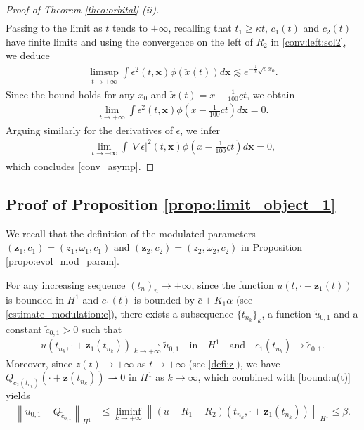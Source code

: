 \documentclass[reqno,10pt]{amsart}
\numberwithin{equation}{section}
\newcommand{\bx}{\mathbf{x}}
\newcommand{\bz}{\mathbf{z}}
\begin{document}
\begin{proof}[Proof of Theorem \ref{theo:orbital} (ii)]
\begin{align*}
\end{align*}
Passing to the limit as $t$ tends to $+\infty$, recalling that $t_1 \geq \kappa t$, $c_1(t)$ and $c_2(t)$ have finite limits and using the convergence on the left of $R_2$ in \eqref{conv:left:sol2}, we deduce
\begin{align*}
	\limsup_{t\rightarrow + \infty} \int \epsilon^2(t,\bx) \phi(\check{x}(t)) d\bx \lesssim e^{-\frac{1}{8}\sqrt{\underline{c}}x_0}.
\end{align*}
Since the bound holds for any $x_0$ and $\check{x}(t)=x-\frac{1}{100} \underline{c} t$, we obtain
\begin{align*}
	\lim_{t\rightarrow +\infty} \int \epsilon^2(t, \bx) \phi(x-\frac1{100} \underline{c} t) d\bx =0.
\end{align*}
Arguing similarly for the derivatives of $\epsilon$, we infer
\begin{align*}
	\lim_{t\rightarrow +\infty} \int \vert \nabla \epsilon \vert^2 (t, \bx) \phi(x-\frac1{100} \underline{c} t) d\bx =0,
\end{align*}
which concludes \eqref{conv_asymp}.

\end{proof}
	
\subsection{Proof of Proposition \ref{propo:limit_object_1}}	
		
		
		We recall that the definition of the modulated parameters $(\bz_1,c_1)=(z_1,\omega_1,c_1)$ and $(\bz_2,c_2)=(z_2,\omega_2,c_2)$ in Proposition \ref{propo:evol_mod_param}.
		
		For any increasing sequence $(t_n)_n\rightarrow +\infty$, since the function $u(t, \cdot + \bz_1(t))$ is bounded in $H^1$  and $c_1(t)$ is bounded by $\bar{c}+K_1\alpha$ (see \eqref{estimate_modulation:c}), there exists a subsequence $\{t_{n_k}\}_k$, a function $\tilde{u}_{0,1}$ and a constant $\tilde{c}_{0,1}>0$ such that
		\begin{align}\label{eq:weak_conv_1}
			u\left(t_{n_k}, \cdot + \bz_1(t_{n_k}) \right) \underset{k \rightarrow +\infty}{\rightharpoonup} \tilde{u}_{0,1} \quad \text{in} \quad H^1  \quad \text{and} \quad c_1(t_{n_k}) \rightarrow \tilde{c}_{0,1}.
		\end{align}
		Moreover, since $z(t) \to +\infty$ as $t \to +\infty$ (see \eqref{defi:z}), we have $Q_{c_2(t_{n_k})}(\cdot+\bz(t_{n_k})) \rightharpoonup 0$ in $H^1$ as $k \to \infty$, which combined with \eqref{bound:u(t)} yields
		\begin{align*}
			\left\| \tilde{u}_{0,1} - Q_{\tilde{c}_{0,1}} \right\|_{H^1} 
			& \leq  \liminf_{k \to +\infty} \left\| \left( u -R_1 - R_2 \right) \left( t_{n_k}, \cdot + \bz_1(t_{n_k}) \right) \right\|_{H^1} \leq \beta.
		\end{align*}
		
\end{document}
